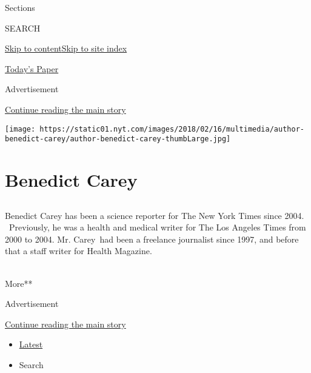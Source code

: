 Sections

SEARCH

\protect\hyperlink{site-content}{Skip to
content}\protect\hyperlink{site-index}{Skip to site index}

\href{https://myaccount.nytimes.com/auth/login?response_type=cookie\&client_id=vi}{}

\href{https://www.nytimes.com/section/todayspaper}{Today's Paper}

Advertisement

\protect\hyperlink{after-top}{Continue reading the main story}

\texttt{[image: https://static01.nyt.com/images/2018/02/16/multimedia/author-benedict-carey/author-benedict-carey-thumbLarge.jpg]}

\hypertarget{benedict-carey}{%
\section{Benedict Carey}\label{benedict-carey}}

\subsection{}

Benedict Carey has been a science reporter for The New York Times since
2004. ~Previously, he was a health and medical writer for The Los
Angeles Times from 2000 to 2004. Mr. Carey~had been a freelance
journalist since 1997, and before that a staff writer for Health
Magazine.~ ~ ~ ~ ~ ~ ~ ~ ~ ~ ~ ~ ~ ~ ~ ~ ~ ~ ~ ~ ~ ~ ~ ~ ~ ~ ~ ~ ~

More**

Advertisement

\protect\hyperlink{after-mid1}{Continue reading the main story}

\begin{itemize}
\tightlist
\item
  \protect\hyperlink{stream-panel}{Latest}
\item
  Search
\end{itemize}

